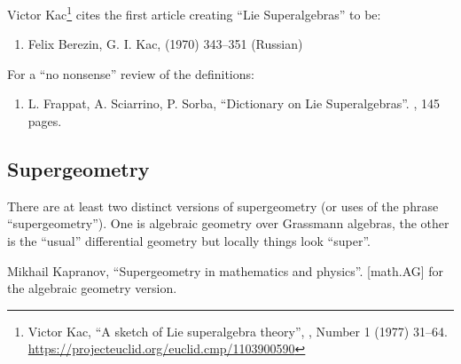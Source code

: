 Victor Kac\footnote{Victor Kac, ``A sketch of Lie superalgebra theory'',  , Number 1 (1977) 31--64. \url{https://projecteuclid.org/euclid.cmp/1103900590}} cites the first article
creating ``Lie Superalgebras'' to be:

\begin{enumerate}[resume*]
\item Felix Berezin, G. I. Kac,   (1970) 343--351 (Russian)
\end{enumerate}
For a ``no nonsense'' review of the definitions:
\begin{enumerate}[resume*]
\item L. Frappat, A. Sciarrino, P. Sorba,
  ``Dictionary on Lie Superalgebras''.\newline
  , 145 pages.
\end{enumerate}

\subsection{Supergeometry}

There are at least two distinct versions of supergeometry (or uses of
the phrase ``supergeometry''). One is algebraic geometry over Grassmann
algebras, the other is the ``usual'' differential geometry but locally
things look ``super''.

\begin{enumerate}[resume,label={[\arabic*]}]
\item Mikhail Kapranov, ``Supergeometry in mathematics and physics''.\newline
{} [math.AG] for the algebraic geometry version.
\end{enumerate}

